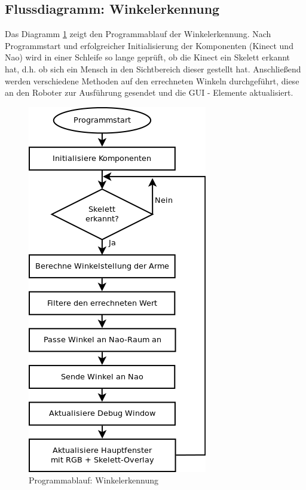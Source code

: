 \subsection{Flussdiagramm: Winkelerkennung}
Das Diagramm \ref{f:pap} zeigt den Programmablauf der Winkelerkennung. Nach Programmstart und erfolgreicher Initialisierung der Komponenten (Kinect und Nao) wird in einer Schleife so lange geprüft, ob die Kinect ein Skelett erkannt hat, d.h. ob sich ein Mensch in den Sichtbereich dieser gestellt hat. Anschließend werden verschiedene Methoden auf den errechneten Winkeln durchgeführt, diese an den Roboter zur Ausführung gesendet und die GUI - Elemente aktualisiert.  
	\begin{figure}[H]						
		\centering							
		\includegraphics[scale=0.8]{Bilder/Flussdiagramm.png}			
		\caption{Programmablauf: Winkelerkennung}						
		\label{f:pap}						
	\end{figure}
